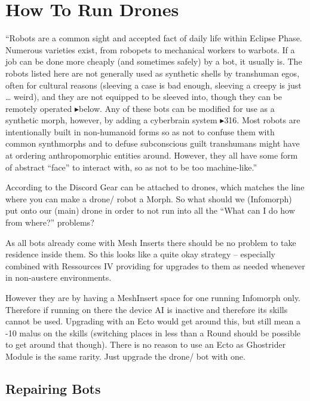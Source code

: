 
\section{How To Run Drones}

“Robots are a common sight and accepted fact of daily life within Eclipse Phase. Numerous varieties exist, from robopets to mechanical workers to warbots. If a job can be done more cheaply (and sometimes safely) by a bot, it usually is. The robots listed here are not generally used as synthetic shells by transhuman egos, often for cultural reasons (sleeving a case is bad enough, sleeving a creepy is just … weird), and they are not equipped to be sleeved into, though they can be remotely operated $\blacktriangleright$below. Any of these bots can be modified for use as a synthetic morph, however, by adding a cyberbrain system $\blacktriangleright$316. Most robots are intentionally built in non-humanoid forms so as not to confuse them with common synthmorphs and to defuse subconscious guilt transhumans might have at ordering anthropomorphic entities around. However, they all have some form of abstract “face” to interact with, so as not to be too machine-like.” \citep[pg. 346]{ep2e_1.1_2019}

According to the Discord Gear can be attached to drones, which matches the line where you can make a drone/ robot a Morph. So what should we (Infomorph) put onto our (main) drone in order to not run into all the “What can I do how from where?” problems?

As all bots already come with Mesh Inserts there should be no problem to take residence inside them. So this looks like a quite okay strategy -- especially combined with Ressources IV providing for upgrades to them as needed whenever in non-austere environments.

However they are by having a \gls{MeshInsert} space for one running Infomorph only. Therefore if running on there the device AI is inactive and therefore its skills cannot be used. \citep[pg. 244]{ep2e_1.1_2019} Upgrading with an \gls{Ecto} would get around this, but still mean a -10 malus on the skills (switching places in less than a Round should be possible to get around that though). There is no reason to use an \gls{Ecto} as \gls{Ghostrider Module} is the same rarity. Just upgrade the drone/ bot with one.

\subsection{Repairing Bots}

